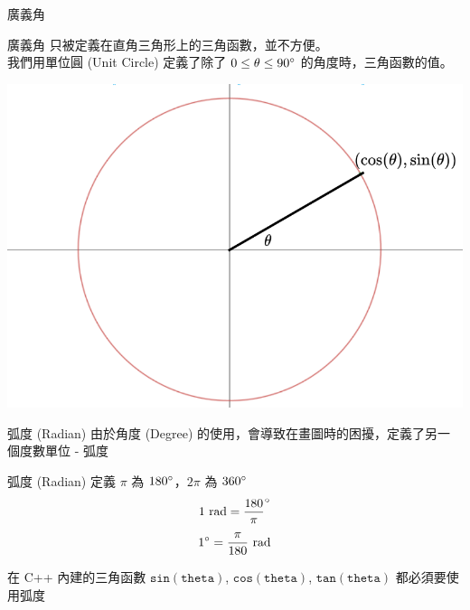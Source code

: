 \documentclass[aspectratio=169]{beamer}
\begin{document}
\begin{frame}{廣義角}
    \begin{alertblock}{廣義角}
    只被定義在直角三角形上的三角函數，並不方便。 \\
    \vspace{5mm}
    我們用單位圓 (Unit Circle) 定義了除了 $0 \le \theta \le 90 \degree$ 的角度時，三角函數的值。
    \end{alertblock}
    \begin{center}
        \includegraphics[scale=0.25]{images/unit circle.png}
    \end{center}
\end{frame}

\begin{frame}{弧度 (Radian)}
    由於角度 (Degree) 的使用，會導致在畫圖時的困擾，定義了另一個度數單位 - 弧度
    \begin{alertblock}{弧度 (Radian)}
        定義 $\pi$ 為 $180 \degree$，$2\pi$ 為 $360 \degree$ \\
        $$1 \text{ rad} = \frac{180}{\pi}\degree$$
        $$1 \degree = \frac{\pi}{180} \text{ rad}$$
    \end{alertblock}
    在 C++ 內建的三角函數 $\mathtt{sin(theta)}$, $\mathtt{cos(theta)}$, $\mathtt{tan(theta)}$ 都必須要使用弧度
\end{frame}
\end{document}
